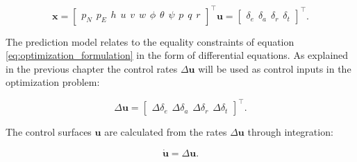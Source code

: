 \begin{subequations}
\begin{equation}
	\label{eq:uav_states}
	\mathbf{x} =
	\begin{bmatrix}
		p_N \hspace{5pt} p_E \hspace{5pt} h \hspace{5pt}
		u \hspace{5pt} v \hspace{5pt} w \hspace{5pt}
		\phi \hspace{5pt} \theta \hspace{5pt} \psi \hspace{5pt}
		p \hspace{5pt} q \hspace{5pt} r
	\end{bmatrix}^\intercal
\end{equation}
\begin{equation}
	\mathbf{u} =
	\begin{bmatrix}
		\delta_e \hspace{5pt} \delta_a \hspace{5pt} \delta_r \hspace{5pt} \delta_t
	\end{bmatrix}^\intercal.
\end{equation}
\end{subequations}

The prediction model relates to the equality constraints of equation \ref{eq:optimization_formulation} in the form of differential equations. As explained in the previous chapter the control rates $\Delta \mathbf{u}$ will be used as control inputs in the optimization problem:

\begin{equation}
	\label{eq:control_rates}
	\Delta\mathbf{u} = 
	\begin{bmatrix}
		\Delta\delta_e \hspace{5pt} \Delta\delta_a \hspace{5pt} \Delta\delta_r \hspace{5pt} \Delta\delta_t
	\end{bmatrix} ^\intercal .
\end{equation}

The control surfaces $\mathbf{u}$ are calculated from the rates $\Delta\mathbf{u}$ through integration:

\begin{equation}
	\label{eq:control_relation}
	\mathbf{\dot{u}} = \Delta\mathbf{u}.
\end{equation}


